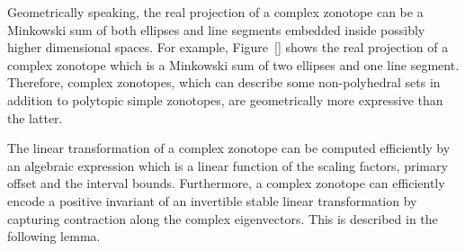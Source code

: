 %
Geometrically speaking, the real projection of a complex zonotope can
be a Minkowski sum of both ellipses and line segments embedded inside
possibly higher dimensional spaces.  For example, Figure~\ref{} shows
the real projection of a complex zonotope which is a Minkowski sum of
two ellipses and one line segment.  Therefore, complex zonotopes,
which can describe some non-polyhedral sets in addition to polytopic
simple zonotopes, are geometrically more expressive than the latter.

The linear transformation of a complex zonotope can be computed
efficiently by an algebraic expression which is a linear function of
the scaling factors, primary offset and the interval bounds.
Furthermore, a complex zonotope can efficiently encode a positive
invariant of an invertible stable linear transformation by capturing
contraction along the complex eigenvectors.  This is described in the
following lemma.

